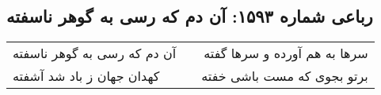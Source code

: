 \begin{center}
\section*{رباعی شماره ۱۵۹۳: آن دم که رسی به گوهر ناسفته}
\label{sec:1593}
\begin{longtable}{l p{0.5cm} r}
آن دم که رسی به گوهر ناسفته
&&
سرها به هم آورده و سرها گفته
\\
کهدان جهان ز باد شد آشفته
&&
برتو بجوی که مست باشی خفته
\\
\end{longtable}
\end{center}
